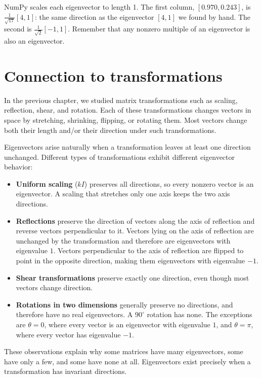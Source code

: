 NumPy scales each eigenvector to length 1. The first column,
$[0.970, 0.243]$, is $\frac{1}{\sqrt{17}}[4, 1]$: the same direction as the
eigenvector $[4, 1]$ we found by hand. The second is $\frac{1}{\sqrt{2}}[-1,
1]$. Remember that any nonzero multiple of an eigenvector is also an
eigenvector.

\section{Connection to transformations}
In the previous chapter, we studied matrix transformations such as scaling, reflection, shear, and rotation. Each of these transformations changes vectors in space by stretching, shrinking, flipping, or rotating them. Most vectors change both their length and/or their direction under such transformations.

Eigenvectors arise naturally when a transformation leaves at least one direction unchanged. Different types of transformations exhibit different eigenvector behavior:

\begin{itemize}
\item \textbf{Uniform scaling} ($kI$) preserves all directions, so every nonzero vector is an eigenvector. A scaling that stretches only one axis keeps the two axis directions.
\item {}\textbf{Reflections} preserve the direction of vectors along the axis of reflection and reverse vectors perpendicular to it. Vectors lying on the axis of reflection are unchanged by the transformation and therefore are eigenvectors with eigenvalue $1$. Vectors perpendicular to the axis of reflection are flipped to point in the opposite direction, making them eigenvectors with eigenvalue $-1$.
\item \textbf{Shear transformations} preserve exactly one direction, even though most vectors change direction.
\item {}\textbf{Rotations in two dimensions} generally preserve no directions, and therefore have no real eigenvectors. A $90^\circ$ rotation has none. The exceptions are $\theta = 0$, where every vector is an eigenvector with eigenvalue $1$, and $\theta = \pi$, where every vector has eigenvalue $-1$.
\end{itemize}

These observations explain why some matrices have many eigenvectors, some have only a few, and some have none at all. Eigenvectors exist precisely when a transformation has invariant directions.

